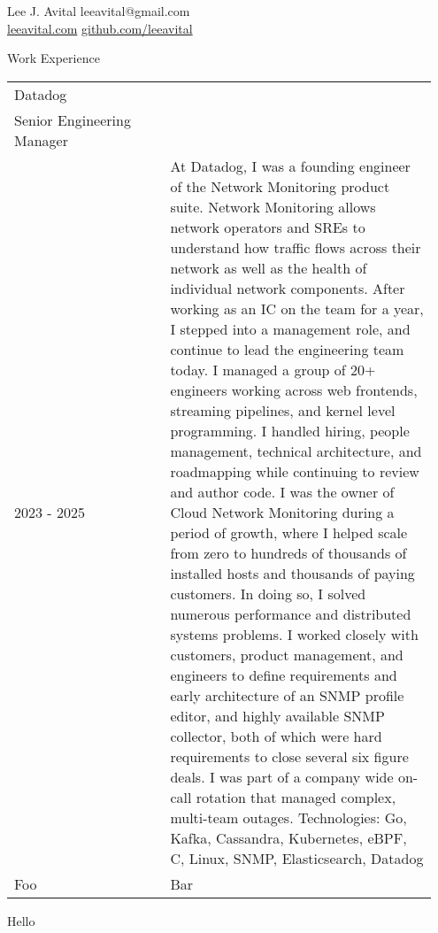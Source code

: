 \documentclass[line,margin]{res}
\begin{document}
Lee J. Avital \hfill  \hfill leeavital@gmail.com \\
\null \hfill \url{leeavital.com} \url{github.com/leeavital}

\hrulefill

Work Experience %

\hrulefill

\begin{tabular}{p{0.35\linewidth} p{0.6\linewidth}}


Datadog \\
Senior Engineering Manager \\
2023 - 2025 
& At Datadog, I was a founding engineer of the Network Monitoring product suite. Network Monitoring allows network operators and SREs to understand how traffic flows across their network as well as the health of individual network components. After working as an IC on the team for a year, I stepped into a management role, and continue to lead the engineering team today.
I managed a group of 20+ engineers working across web frontends, streaming pipelines, and kernel level programming.  I handled hiring, people management, technical architecture, and roadmapping while continuing to review and author code.
I was the owner of Cloud Network Monitoring during a period of growth, where I helped scale from zero to hundreds of thousands of installed hosts and thousands of paying customers. In doing so, I solved numerous performance and distributed systems problems.
I worked closely with customers, product management, and engineers to define requirements and early architecture of an SNMP profile editor, and highly available SNMP collector, both of which were hard requirements to close several six figure deals.
I was part of a company wide on-call rotation that managed complex, multi-team outages.
Technologies: Go, Kafka, Cassandra, Kubernetes, eBPF, C, Linux, SNMP, Elasticsearch, Datadog \\

  Foo & Bar

\end{tabular}

Hello
\end{document}
